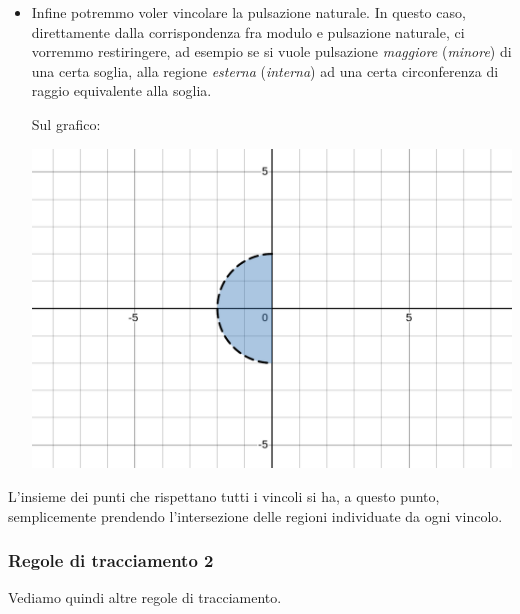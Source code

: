 \documentclass[a4paper,11pt]{article}
\begin{document}
\begin{itemize}
	\item
		Infine potremmo voler vincolare la pulsazione naturale.
		In questo caso, direttamente dalla corrispondenza fra modulo e pulsazione naturale, ci vorremmo restiringere, ad esempio se si vuole pulsazione \textit{maggiore} (\textit{minore}) di una certa soglia, alla regione \textit{esterna} (\textit{interna}) ad una certa circonferenza di raggio equivalente alla soglia.
		
		\newpage

		Sul grafico:
		\begin{center}
			\includegraphics[scale=0.28]{../figures/fixed_pulse_region.png}
		\end{center}
\end{itemize}

L'insieme dei punti che rispettano tutti i vincoli si ha, a questo punto, semplicemente prendendo l'intersezione delle regioni individuate da ogni vincolo.

\subsubsection{Regole di tracciamento 2}
Vediamo quindi altre regole di tracciamento.
\end{document}
